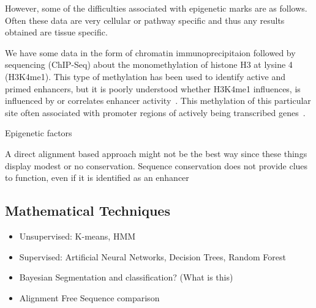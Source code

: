         However, some of the difficulties associated with epigenetic marks are as follows. Often these data are very cellular or pathway specific and thus any results obtained are tissue specific. 

        
        We have some data in the form of chromatin immunoprecipitaion followed by sequencing (ChIP-Seq) about the monomethylation of histone H3 at lysine 4 (H3K4me1). This type of methylation has been used to identify active and primed enhancers, but it is poorly understood whether H3K4me1 influences, is influenced by or correlates enhancer activity~\cite{rada2018h3k4me1}. This methylation of this particular site often associated with promoter regions of actively being transcribed genes~\cite{barski2007high}. 
        
        Epigenetic factors 


        
        
        

        
        
        
        A direct alignment based approach might not be the best way since these things display modest or no conservation. Sequence conservation does not provide clues to function, even if it is identified as an enhancer~\cite{pennacchio2013enhancers}
        

        \subsection{Mathematical Techniques}
        \begin{itemize}
        	\item Unsupervised: K-means, HMM
        	\item Supervised: Artificial Neural Networks, Decision Trees, Random Forest
        	\item Bayesian Segmentation and classification? (What is this)
        	\item Alignment Free Sequence comparison 
        \end{itemize}

